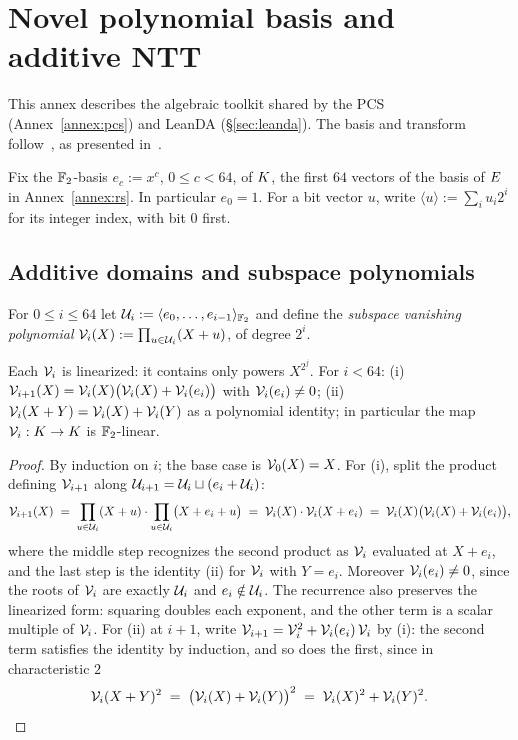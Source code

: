 \section{Novel polynomial basis and additive NTT}\label{app:ntt}

This annex describes the algebraic toolkit shared by the PCS (Annex~\ref{annex:pcs}) and LeanDA (\S\ref{sec:leanda}). The basis and transform follow~\cite{LCH14}, as presented in~\cite{DP24}.

Fix the $\mathbb{F}_2$-basis $e_c:=x^c$, $0\le c<64$, of $K$, the first $64$ vectors of the basis of $E$ in Annex~\ref{annex:rs}. In particular $e_0=1$. For a bit vector $u$, write $\langle u\rangle:=\sum_i u_i2^i$ for its integer index, with bit $0$ first.

\subsection{Additive domains and subspace polynomials}\label{sec:ntt-subspaces}

For $0 \le i \le 64$ let $\mathcal{U}_i := \langle e_0, \dots, e_{i-1} \rangle_{\mathbb{F}_2}$ and define the \emph{subspace vanishing polynomial} $\mathcal{V}_i(X) := \prod_{u \in \mathcal{U}_i}(X + u)$, of degree $2^i$.

\begin{lemma}\label{lem:subspace}
Each $\mathcal{V}_i$ is linearized: it contains only powers $X^{2^j}$. For $i < 64$: (i) $\mathcal{V}_{i+1}(X) = \mathcal{V}_i(X)\bigl(\mathcal{V}_i(X) + \mathcal{V}_i(e_i)\bigr)$ with $\mathcal{V}_i(e_i) \neq 0$; (ii) $\mathcal{V}_i(X + Y) = \mathcal{V}_i(X) + \mathcal{V}_i(Y)$ as a polynomial identity; in particular the map $\mathcal{V}_i : K \to K$ is $\mathbb{F}_2$-linear.
\end{lemma}

\begin{proof}
By induction on $i$; the base case is $\mathcal{V}_0(X) = X$. For (i), split the product defining $\mathcal{V}_{i+1}$ along $\mathcal{U}_{i+1} = \mathcal{U}_i \sqcup (e_i + \mathcal{U}_i)$:
\[
\mathcal{V}_{i+1}(X) \;=\; \prod_{u \in \mathcal{U}_i} (X + u) \cdot \prod_{u \in \mathcal{U}_i} \bigl(X + e_i + u\bigr) \;=\; \mathcal{V}_i(X) \cdot \mathcal{V}_i(X + e_i) \;=\; \mathcal{V}_i(X) \bigl( \mathcal{V}_i(X) + \mathcal{V}_i(e_i) \bigr),
\]
where the middle step recognizes the second product as $\mathcal{V}_i$ evaluated at $X + e_i$, and the last step is the identity (ii) for $\mathcal{V}_i$ with $Y = e_i$. Moreover $\mathcal{V}_i(e_i) \neq 0$, since the roots of $\mathcal{V}_i$ are exactly $\mathcal{U}_i$ and $e_i \notin \mathcal{U}_i$. The recurrence also preserves the linearized form: squaring doubles each exponent, and the other term is a scalar multiple of $\mathcal{V}_i$. For (ii) at $i + 1$, write $\mathcal{V}_{i+1} = \mathcal{V}_i^2 + \mathcal{V}_i(e_i)\, \mathcal{V}_i$ by (i): the second term satisfies the identity by induction, and so does the first, since in characteristic $2$
\[
\mathcal{V}_i(X+Y)^2 \;=\; \bigl(\mathcal{V}_i(X) + \mathcal{V}_i(Y)\bigr)^2 \;=\; \mathcal{V}_i(X)^2 + \mathcal{V}_i(Y)^2 . \qedhere
\]
\end{proof}

